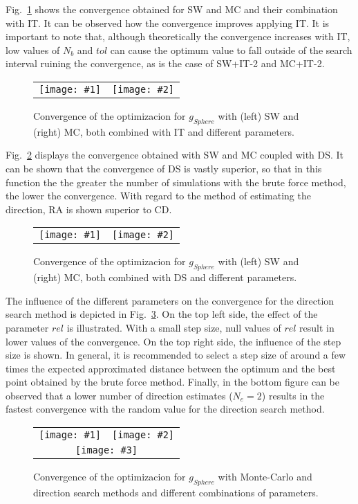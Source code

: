 \documentclass[review,authoryear]{elsarticle}
\newcommand{\PLOTII}[4]
{
	\begin{figure}[ht!]
		\centering
		\begin{tabular}{cc}
			\texttt{[image: \#1]} & \texttt{[image: \#2]}
		\end{tabular}
		\caption{#3.\label{#4}}
	\end{figure}
}
\newcommand{\FIGIII}[5]
{
	\begin{figure}[ht!]
		\centering
		\begin{tabular}{cc}
			\texttt{[image: \#1]} & \texttt{[image: \#2]} \\
			\multicolumn{2}{c}{\texttt{[image: \#3]}}
		\end{tabular}
		\caption{#4.\label{#5}}
	\end{figure}
}
\begin{document}
Fig.~\ref{FigSphereSWMC} shows the convergence obtained for SW and MC and their
combination with IT. It can
be observed how the convergence improves applying IT. It is important
to note that, although theoretically the convergence increases with IT, 
low values of $N_b$ and $tol$ can cause the optimum value to fall outside of the search
interval ruining the convergence, as is the case of SW+IT-2 and MC+IT-2.
\PLOTII{sphere-evolution-sw.eps}{sphere-evolution-mc.eps}
{Convergence of the optimizacion for $g_{Sphere}$ with (left) SW and (right) MC,
both combined with IT and different parameters}{FigSphereSWMC}

Fig.~\ref{FigSphereSWMCGR} displays the convergence obtained with SW and MC
coupled with DS. It can be shown that the convergence of DS is vastly superior,
so that in this function the the greater the number of simulations with 
the brute force method, the lower the convergence. With regard to the method of
estimating the direction, RA is shown superior to CD.
\PLOTII{sphere-evolution-sw-cdr.eps}{sphere-evolution-mc-cdr.eps}
{Convergence of the optimizacion for $g_{Sphere}$ with (left) SW and (right) MC,
both combined with DS and different parameters}{FigSphereSWMCGR}

The influence of the different parameters on the convergence for the direction
search method is depicted in Fig.~\ref{FigSphereMCCDR}.
On the top left side, the effect of the parameter $rel$ is illustrated. With a
small step size, null values of $rel$ result in lower values of the convergence.
On the top right side, the influence of the step size is shown. In general,
it is recommended to select a step size of around a few times the expected 
approximated distance between the optimum and the best point obtained by the brute
force method. Finally, in the bottom figure can be observed that a lower number of direction
estimates ($N_e=2$) results in the fastest convergence with the random value for the
direction search method. 
\FIGIII{sphere-evolution-mc-cd-r.eps}{sphere-evolution-mc-cd-s.eps}
{sphere-evolution-mc-r.eps}
{Convergence of the optimizacion for $g_{Sphere}$ with Monte-Carlo and direction
search methods and different combinations of parameters}{FigSphereMCCDR}
 
\end{document}
